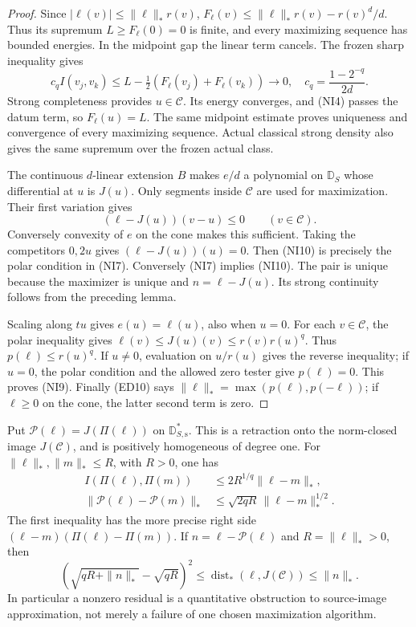 \begin{proof}
Since $|\ell(v)|\leq\|\ell\|_*r(v)$,
$F_\ell(v)\leq\|\ell\|_*r(v)-r(v)^d/d$. Thus its supremum
$L\geq F_\ell(0)=0$ is finite, and every maximizing sequence
has bounded energies. In the midpoint gap the linear term
cancels. The frozen sharp inequality gives
\[
 c_q I(v_j,v_k)
     \leq L-\tfrac12(F_\ell(v_j)+F_\ell(v_k))\longrightarrow0,
 \quad c_q=\frac{1-2^{-q}}{2d}.
\]
Strong completeness provides $u\in\mathscr C$. Its energy
converges, and (NI4) passes the datum term, so $F_\ell(u)=L$.
The same midpoint estimate proves uniqueness and convergence
of every maximizing sequence. Actual classical strong density
also gives the same supremum over the frozen actual class.

The continuous $d$-linear extension $B$ makes $e/d$ a polynomial
on $\mathbb D_S$ whose differential at $u$ is $J(u)$.
Only segments inside $\mathscr C$ are used for maximization.
Their first variation gives
\[
                   (\ell-J(u))(v-u)\leq0\qquad(v\in\mathscr C).
 \tag{NI10}
\]
Conversely convexity of $e$ on the cone makes this sufficient.
Taking the competitors $0,2u$ gives $(\ell-J(u))(u)=0$.
Then (NI10) is precisely the polar condition in (NI7).
Conversely (NI7) implies (NI10). The pair is unique because
the maximizer is unique and $n=\ell-J(u)$. Its strong continuity
follows from the preceding lemma.

Scaling along $tu$ gives $e(u)=\ell(u)$, also when $u=0$.
For each $v\in\mathscr C$, the polar inequality gives
$\ell(v)\leq J(u)(v)\leq r(v)r(u)^q$. Thus
$p(\ell)\leq r(u)^q$. If $u\ne0$, evaluation on $u/r(u)$
gives the reverse inequality; if $u=0$, the polar condition
and the allowed zero tester give $p(\ell)=0$. This proves
(NI9). Finally (ED10) says
$\|\ell\|_* =\max(p(\ell),p(-\ell))$; if $\ell\geq0$ on
the cone, the latter second term is zero.
\end{proof}

\begin{theorem}
\label{thm:r12-source-retraction}
Put $\mathcal P(\ell)=J(\Pi(\ell))$ on
$\mathbb D_{S,\mathrm{s}}^*$. This is a retraction onto the norm-closed
image $J(\mathscr C)$, and is positively homogeneous of degree one.
For $\|\ell\|_*,\|m\|_*\leq R$, with $R>0$, one has
\[
 \begin{split}
 I(\Pi(\ell),\Pi(m))&\leq2R^{1/q}\|\ell-m\|_*,\\
 \|\mathcal P(\ell)-\mathcal P(m)\|_*
                         &\leq\sqrt{2qR}\,\|\ell-m\|_*^{1/2}.
 \end{split}
 \tag{NI11}
\]
The first inequality has the more precise right side
$(\ell-m)(\Pi(\ell)-\Pi(m))$. If
$n=\ell-\mathcal P(\ell)$ and $R=\|\ell\|_*>0$, then
\[
 \left(\sqrt{qR+\|n\|_*}-\sqrt{qR}\right)^2
 \leq\operatorname{dist}_*(\ell,J(\mathscr C))\leq\|n\|_*.
 \tag{NI12}
\]
In particular a nonzero residual is a quantitative obstruction to
source-image approximation, not merely a failure of one chosen
maximization algorithm.
\end{theorem}

